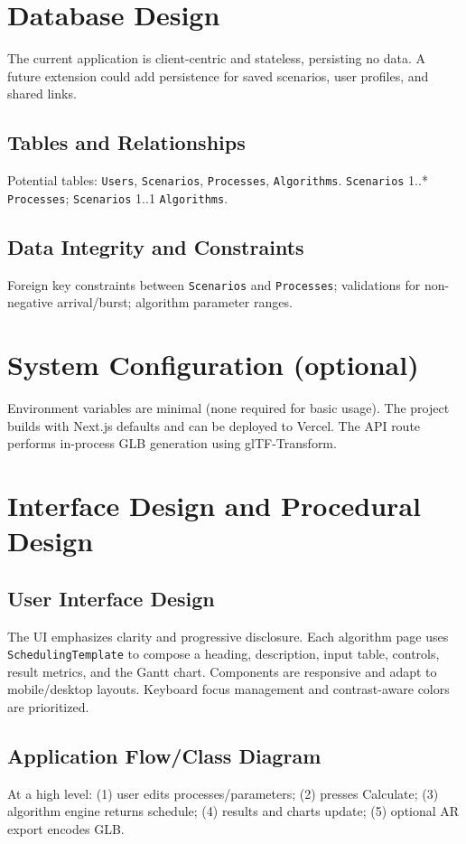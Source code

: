 \documentclass[12pt,a4paper,oneside]{report}
\begin{document}
\section{Database Design}
The current application is client-centric and stateless, persisting no data. A future extension could add persistence for saved scenarios, user profiles, and shared links.
\subsection{Tables and Relationships}
Potential tables: \texttt{Users}, \texttt{Scenarios}, \texttt{Processes}, \texttt{Algorithms}. \texttt{Scenarios} 1..* \texttt{Processes}; \texttt{Scenarios} 1..1 \texttt{Algorithms}.
\subsection{Data Integrity and Constraints}
Foreign key constraints between \texttt{Scenarios} and \texttt{Processes}; validations for non-negative arrival/burst; algorithm parameter ranges.

\section{System Configuration (optional)}
Environment variables are minimal (none required for basic usage). The project builds with Next.js defaults and can be deployed to Vercel. The API route performs in-process GLB generation using glTF-Transform.

\section{Interface Design and Procedural Design}
\subsection{User Interface Design}
The UI emphasizes clarity and progressive disclosure. Each algorithm page uses \verb|SchedulingTemplate| to compose a heading, description, input table, controls, result metrics, and the Gantt chart. Components are responsive and adapt to mobile/desktop layouts. Keyboard focus management and contrast-aware colors are prioritized.

\subsection{Application Flow/Class Diagram}
At a high level: (1) user edits processes/parameters; (2) presses Calculate; (3) algorithm engine returns schedule; (4) results and charts update; (5) optional AR export encodes GLB.
\end{document}
